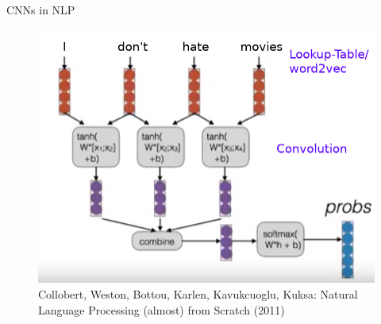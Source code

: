 \documentclass{beamer}
\begin{document}
\begin{frame}{CNNs in NLP}
\begin{figure}[ht]
    \centering
    \includegraphics[width=0.8\paperwidth, height=0.7\paperheight, keepaspectratio]{graphics/tdnns.png}
    \captionsetup{labelformat=empty}
    \caption{Collobert, Weston, Bottou, Karlen, Kavukcuoglu, Kuksa: 
Natural Language Processing (almost) from Scratch (2011)}
\end{figure}
\end{frame}
\end{document}

